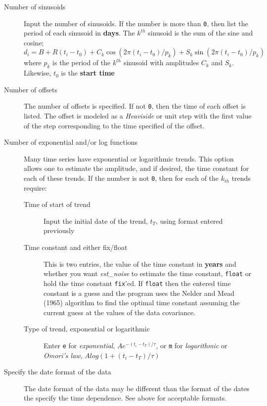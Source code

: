 \documentclass[12pt]{amsart}
\begin{document}
\begin{description}
\item[Number of sinusoids] Input the number of sinusoids. If the number is more than \texttt{0}, then list the
period of each sinusoid in \textbf{days}. The $k^{th}$ sinusoid is the sum of the sine and cosine;
\begin{equation}
d_i  = B + R (t_i - t_0) + C_k \cos (2 {\pi}(t_i - t_0)/{p_k})+ S_k \sin (2 {\pi}(t_i - t_0)/{p_k})
\end{equation}
where $p_k$ is the period of the $k^{th}$ sinusoid with amplitudes $C_k$ and $S_k$.  Likewise, $t_0$ is the \textbf{start time}

\item[Number of offsets] The number of offsets is specified. If not \texttt{0}, then the time of each offset
is listed. The offset is modeled as a \textit{Heaviside} or unit step with the first value of the step corresponding
to the time specified of the offset.

\item[Number of exponential and/or log functions]  Many time series have exponential or logarithmic trends. This
option allows one to estimate the amplitude, and if desired, the time constant for each of these trends. If the number
is not \texttt{0}, then for each of the $k_{th}$ trends require:
\begin{description}
\item[Time of start of trend] Input the initial date of the trend, $t_T$, using format entered previously
\item[Time constant and either fix/float] This is two entries, the value of the time constant in \textbf{years} and
whether you want \textit{est\_noise} to estimate the time constant, \texttt{float} or hold the time constant \texttt{fix}'ed.
If \texttt{float} then the entered time constant is a guess and the program uses the Nelder and Mead (1965) algorithm
to find the optimal time constant assuming the current guess at the values of the data covariance.
\item[ Type of trend, exponential or logarithmic] Enter \texttt{e} for \textit{exponential}, $A e ^{-(t_i - t_T)/{\tau}}$, or
\texttt{m} for \textit{logarithmic} or \textit{Omori's law}, $A log (1 + {(t_i - t_T)/{\tau}})$
\end{description}

\item[Specify the date format of the data] The date format of the data may be different than the format of the dates
the specify the time dependence. See above for acceptable formats.


\end{description}
\end{document}
